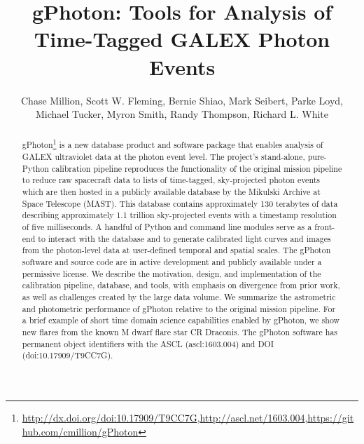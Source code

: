 \documentclass[preprint]{aastex}
\begin{document}
\title{gPhoton: Tools for Analysis of Time-Tagged GALEX Photon Events}

\author{
  Chase Million,
  Scott W. Fleming,
  Bernie Shiao,
  Mark Seibert,
  Parke Loyd,
  Michael Tucker,
  Myron Smith,
  Randy Thompson,
  Richard L. White
}



\begin{abstract}
gPhoton\footnote{\url{http://dx.doi.org/doi:10.17909/T9CC7G},\url{http://ascl.net/1603.004},\url{https://github.com/cmillion/gPhoton}} is a new database product and software package that enables analysis of GALEX ultraviolet data at the photon event level. The project's stand-alone, pure-Python calibration pipeline reproduces the functionality of the original mission pipeline to reduce raw spacecraft data to lists of time-tagged, sky-projected photon events which are then hosted in a publicly available database by the Mikulski Archive at Space Telescope (MAST). This database contains approximately 130 terabytes of data describing approximately 1.1 trillion sky-projected events with a timestamp resolution of five milliseconds. A handful of Python and command line modules serve as a front-end to interact with the database and to generate calibrated light curves and images from the photon-level data at user-defined temporal and spatial scales. The gPhoton software and source code are in active development and publicly available under a permissive license. We describe the motivation, design, and implementation of the calibration pipeline, database, and tools, with emphasis on divergence from prior work, as well as challenges created by the large data volume. We summarize the astrometric and photometric performance of gPhoton relative to the original mission pipeline. For a brief example of short time domain science capabilities enabled by gPhoton, we show new flares from the known M dwarf flare star CR Draconis. The gPhoton software has permanent object identifiers with the ASCL (ascl:1603.004) and DOI (doi:10.17909/T9CC7G).
\end{abstract}
\end{document}
